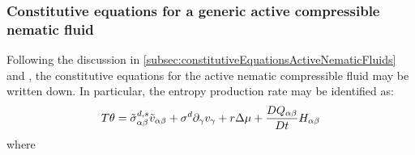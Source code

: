 \subsubsection{Constitutive equations for a generic active compressible nematic fluid}
Following the discussion in \autoref{subsec:constitutiveEquationsActiveNematicFluids} and \citep{julicher2018hydrodynamic}, the constitutive equations for the active nematic compressible fluid may be written down. In particular, the entropy production rate may be identified as:
\begin{equation}\label{eq:entropyProductionActiveNematicGenericModelMN}
    T\theta = \Tilde{\sigma}^{d,s}_{\alpha\beta}\Tilde{v}_{\alpha\beta} + \sigma^d\inlinePartial{\gamma}{v_\gamma} + r\Delta\mu + \frac{DQ_{\alpha\beta}}{Dt}H_{\alpha\beta}
\end{equation}
where 
